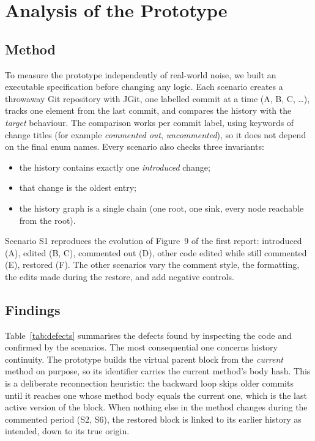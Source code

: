 \documentclass[11pt,a4paper]{article}
\newcommand{\change}[1]{\textit{#1}}
\begin{document}
\section{Analysis of the Prototype}\label{sec:analysis}

\subsection{Method}
To measure the prototype independently of real-world noise, we built an executable specification before changing any logic. Each scenario creates a throwaway Git repository with JGit, one labelled commit at a time (A, B, C, \ldots), tracks one element from the last commit, and compares the history with the \emph{target} behaviour. The comparison works per commit label, using keywords of change titles (for example \change{commented out}, \change{uncommented}), so it does not depend on the final enum names. Every scenario also checks three invariants:
\begin{itemize}
  \item the history contains exactly one \change{introduced} change;
  \item that change is the oldest entry;
  \item the history graph is a single chain (one root, one sink, every node reachable from the root).
\end{itemize}
Scenario S1 reproduces the evolution of Figure~9 of the first report: introduced (A), edited (B, C), commented out (D), other code edited while still commented (E), restored (F). The other scenarios vary the comment style, the formatting, the edits made during the restore, and add negative controls.

\subsection{Findings}
Table~\ref{tab:defects} summarises the defects found by inspecting the code and confirmed by the scenarios. The most consequential one concerns history continuity. The prototype builds the virtual parent block from the \emph{current} method on purpose, so its identifier carries the current method's body hash. This is a deliberate reconnection heuristic: the backward loop skips older commits until it reaches one whose method body equals the current one, which is the last active version of the block. When nothing else in the method changes during the commented period (S2, S6), the restored block is linked to its earlier history as intended, down to its true origin.
\end{document}
